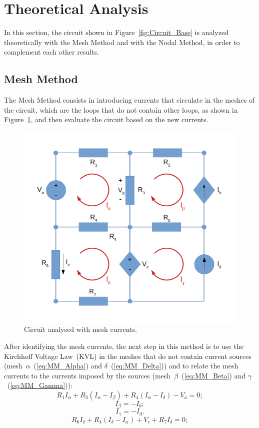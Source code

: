 \section{Theoretical Analysis}
\label{sec:analysis}

In this section, the circuit shown in Figure~\ref{fig:Circuit_Base} is analyzed theoretically with the Mesh Method and with the Nodal Method, in order to complement each other results.

\subsection{Mesh Method}

The Mesh Method consists in introducing currents that circulate in the meshes of the circuit, which are the loops that do not contain other loops, as shown in Figure~\ref{fig:Circuit_Mesh}, and then evaluate the circuit based on the new currents.
\begin{figure}[h] \centering
\includegraphics[width=0.45\linewidth]{CircuitMesh.pdf}
\caption{Circuit analysed with mesh currents.}
\label{fig:Circuit_Mesh}
\end{figure}

After identifying the mesh currents, the next step in this method is to use the Kirchhoff Voltage Law~(KVL) in the meshes that do not contain current sources (mesh~$\alpha$~(\ref{eq:MM_Alpha}) and $\delta$~(\ref{eq:MM_Delta})) and to relate the mesh currents to the currents imposed by the sources (mesh~$\beta$~(\ref{eq:MM_Beta}) and $\gamma$~(\ref{eq:MM_Gamma})):
\begin{equation}
  R_1I_{\alpha} + R_3(I_{\alpha}-I_{\beta}) + R_4(I_{\alpha}-I_{\delta}) - V_a = 0;
  \label{eq:MM_Alpha}
\end{equation}
\begin{equation}
  I_{\beta} = - I_b;
  \label{eq:MM_Beta}
\end{equation}
\begin{equation}
  I_{\gamma} = - I_d.
  \label{eq:MM_Gamma}
\end{equation}
\begin{equation}
  R_6I_{\delta} + R_4(I_{\delta}-I_{\alpha}) + V_c + R_7I_{\delta} = 0;
  \label{eq:MM_Delta}
\end{equation}

